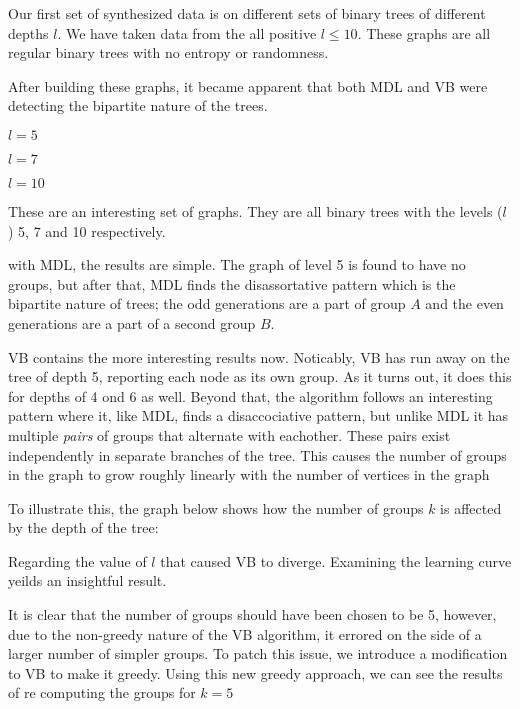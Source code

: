 Our first set of synthesized data is on different sets of
binary trees of different depths $l$. We have taken data from
the all positive $l \le 10$. These graphs are all regular binary
trees with no entropy or randomness.

After building these graphs, it became apparent that both MDL and
VB were detecting the bipartite nature of the trees.

\begin{minipage}{\linewidth}

$l=5$


$l=7$


$l=10$

\end{minipage}

These are an interesting set of graphs. They are all binary trees with
the levels ($l$) 5, 7 and 10 respectively.

with MDL, the results are simple. The graph of level 5 is found to have
no groups, but after that, MDL finds the disassortative pattern which
is the bipartite nature of trees; the odd generations are a part of
group $A$ and the even generations are a part of a second group $B$.

VB contains the more interesting results now. Noticably, VB has run away
on the tree of depth 5, reporting each node as its own group.  As it
turns out, it does this for depths of 4 ond 6 as well. Beyond that, the
algorithm follows an interesting pattern where it, like MDL, finds a
disaccociative pattern, but unlike MDL it has multiple \emph{pairs} of
groups that alternate with eachother. These pairs exist independently in
separate branches of the tree. This causes the number of groups in the
graph to grow roughly linearly with the number of vertices in the graph

To illustrate this, the graph below shows how the number of groups $k$ is
affected by the depth of the tree:



Regarding the value of $l$ that caused VB to diverge. Examining the
learning curve yeilds an insightful result.


It is clear that the number of groups should have been chosen to be 5,
however, due to the non-greedy nature of the VB algorithm, it errored
on the side of a larger number of simpler groups. To patch this issue,
we introduce a modification to VB to make it greedy. Using this new greedy
approach, we can see the results of re computing the groups for $k=5$

